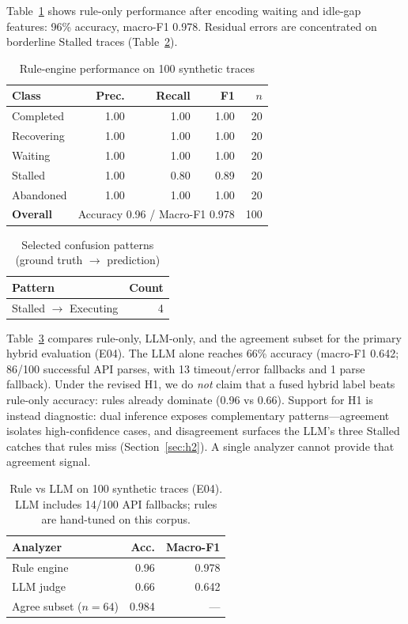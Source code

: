 \documentclass[conference]{IEEEtran}
\begin{document}
Table~\ref{tab:metrics} shows rule-only performance after encoding waiting and idle-gap
features: 96\% accuracy, macro-F1 0.978. Residual errors are concentrated on borderline
Stalled traces (Table~\ref{tab:confusion}).

\begin{table}[H]
\caption{Rule-engine performance on 100 synthetic traces}
\label{tab:metrics}
\centering
\small
\begin{tabular}{@{}lrrrr@{}}
\toprule
Class & Prec. & Recall & F1 & $n$ \\ \midrule
Completed & 1.00 & 1.00 & 1.00 & 20 \\
Recovering & 1.00 & 1.00 & 1.00 & 20 \\
Waiting & 1.00 & 1.00 & 1.00 & 20 \\
Stalled & 1.00 & 0.80 & 0.89 & 20 \\
Abandoned & 1.00 & 1.00 & 1.00 & 20 \\ \midrule
\textbf{Overall} & \multicolumn{3}{c}{Accuracy 0.96 / Macro-F1 0.978} & 100 \\ \bottomrule
\end{tabular}
\end{table}

\begin{table}[H]
\caption{Selected confusion patterns (ground truth $\rightarrow$ prediction)}
\label{tab:confusion}
\centering
\small
\begin{tabular}{@{}lr@{}}
\toprule
Pattern & Count \\ \midrule
Stalled $\rightarrow$ Executing & 4 \\ \bottomrule
\end{tabular}
\end{table}

Table~\ref{tab:hybrid} compares rule-only, LLM-only, and the agreement subset for the
primary hybrid evaluation (E04). The LLM alone reaches 66\% accuracy (macro-F1 0.642;
86/100 successful API parses, with 13 timeout/error fallbacks and 1 parse fallback).
Under the revised H1, we do \emph{not} claim that a fused hybrid label beats rule-only
accuracy: rules already dominate (0.96 vs 0.66). Support for H1 is instead diagnostic:
dual inference exposes complementary patterns---agreement isolates high-confidence cases,
and disagreement surfaces the LLM's three Stalled catches that rules miss
(Section~\ref{sec:h2}). A single analyzer cannot provide that agreement signal.

\begin{table}[H]
\caption{Rule vs LLM on 100 synthetic traces (E04). LLM includes 14/100 API fallbacks; rules are hand-tuned on this corpus.}
\label{tab:hybrid}
\centering
\small
\begin{tabular}{@{}lrr@{}}
\toprule
Analyzer & Acc. & Macro-F1 \\ \midrule
Rule engine & 0.96 & 0.978 \\
LLM judge & 0.66 & 0.642 \\
Agree subset ($n{=}64$) & 0.984 & --- \\ \bottomrule
\end{tabular}
\end{table}
\end{document}
